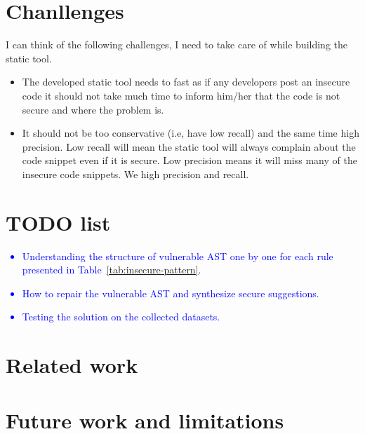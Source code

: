 \documentclass[sigconf]{acmart}
\begin{document}
\section{Chanllenges}
I can think of the following challenges, I need to take care of while building the static tool.
\begin{itemize}
  \item The developed static tool needs to fast as if any developers post an insecure code it should not take much time to inform him/her that the code is not secure and where the problem is.
  \item It should not be too conservative (i.e, have low recall) and the same time high precision. Low recall will mean the static tool will always complain about the code snippet even if it is secure. Low precision means it will miss many of the insecure code snippets. We high precision and recall. 
\end{itemize}

\section{TODO list}
\textcolor{blue}{
\begin{itemize}
  \item Understanding the structure of vulnerable AST one by one for each rule presented in Table~\ref{tab:insecure-pattern}.
  \item How to repair the vulnerable AST and synthesize secure suggestions. 
  \item Testing the solution on the collected datasets.
\end{itemize}
}
\fi
\section{Related work}
\section{Future work and limitations}


  
  

\end{document}
